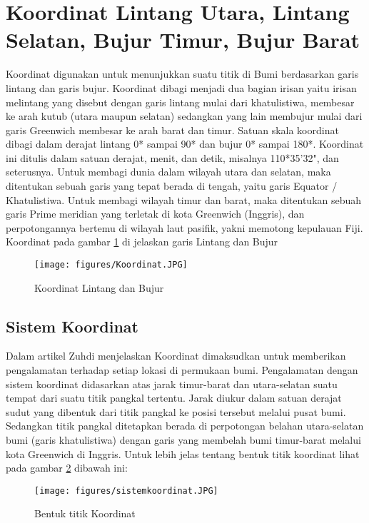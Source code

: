 

\section{Koordinat Lintang Utara, Lintang Selatan, Bujur Timur, Bujur Barat}
Koordinat digunakan untuk menunjukkan suatu titik di Bumi berdasarkan garis lintang dan garis bujur. Koordinat dibagi menjadi dua bagian irisan yaitu irisan melintang yang disebut dengan garis lintang mulai dari khatulistiwa, membesar ke arah kutub (utara maupun selatan) sedangkan yang lain membujur mulai dari garis Greenwich membesar ke arah barat dan timur. Satuan skala koordinat dibagi dalam derajat lintang 0* sampai 90* dan bujur 0* sampai 180*. Koordinat ini ditulis dalam satuan derajat, menit, dan detik, misalnya 110*35'32", dan seterusnya. Untuk membagi dunia dalam wilayah utara dan selatan, maka ditentukan sebuah garis yang tepat berada di tengah, yaitu garis Equator / Khatulistiwa. Untuk membagi wilayah timur dan barat, maka ditentukan sebuah garis Prime meridian yang terletak di kota Greenwich (Inggris), dan perpotongannya bertemu di wilayah laut pasifik, yakni memotong kepulauan Fiji.
Koordinat pada gambar \ref{Koordinat} di jelaskan garis Lintang dan Bujur
\begin{figure}[ht]
	\centerline{\texttt{[image: figures/Koordinat.JPG]}}
	\caption{Koordinat Lintang dan Bujur}
	\label{Koordinat}
	\end{figure}

\subsection{Sistem Koordinat}
Dalam artikel Zuhdi menjelaskan Koordinat dimaksudkan untuk memberikan pengalamatan terhadap setiap lokasi di permukaan bumi. Pengalamatan dengan sistem koordinat didasarkan atas jarak timur-barat dan utara-selatan suatu tempat dari suatu titik pangkal tertentu. Jarak diukur dalam satuan derajat sudut yang dibentuk dari titik pangkal ke posisi tersebut melalui pusat bumi. Sedangkan titik pangkal ditetapkan berada di perpotongan belahan utara-selatan bumi (garis khatulistiwa) dengan garis yang membelah bumi timur-barat melalui kota Greenwich di Inggris. 
Untuk lebih jelas tentang bentuk titik koordinat lihat pada gambar \ref{sistem koordinat} dibawah ini:
\begin{figure}[ht]
	\centerline{\texttt{[image: figures/sistemkoordinat.JPG]}}
	\caption{Bentuk titik Koordinat}
	\label{sistem koordinat}
	\end{figure}


